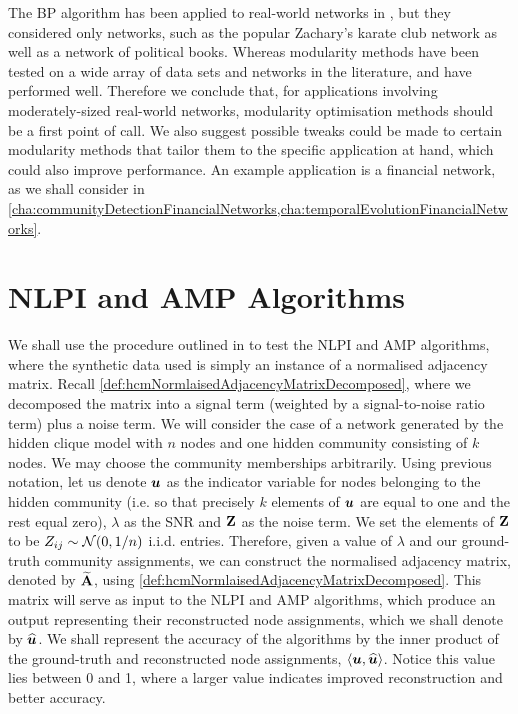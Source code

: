 The BP algorithm has been applied to real-world networks in \cite{DKM+13}, but they considered only networks, such as the popular Zachary's karate club network as well as a network of political books.
Whereas modularity methods have been tested on a wide array of data sets and networks in the literature, and have performed well.
Therefore we conclude that, for applications involving moderately-sized real-world networks, modularity optimisation methods should be a first point of call.
We also suggest possible tweaks could be made to certain modularity methods that tailor them to the specific application at hand, which could also improve performance.
An example application is a financial network, as we shall consider in \cref{cha:communityDetectionFinancialNetworks,cha:temporalEvolutionFinancialNetworks}.


\section{NLPI and AMP Algorithms}
\label{sec:NLPIAndAMPAlgorithms}

We shall use the procedure outlined in \cite{Mon13} to test the NLPI and AMP algorithms, where the synthetic data used is simply an instance of a normalised adjacency matrix. Recall \cref{def:hcmNormlaisedAdjacencyMatrixDecomposed}, where we decomposed the matrix into a signal term (weighted by a signal-to-noise ratio term) plus a noise term.
We will consider the case of a network generated by the hidden clique model with $n$ nodes and one hidden community consisting of $k$ nodes.
We may choose the community memberships arbitrarily. Using previous notation, let us denote $\vecvar{u}$ as the indicator variable for nodes belonging to the hidden community (i.e. so that precisely $k$ elements of $\vecvar{u}$ are equal to one and the rest equal zero), $\lambda$ as the SNR and $\mathbf Z$ as the noise term.
We set the elements of $\mathbf Z$ to be $Z_{ij} \sim \normal{0,1/n}$ i.i.d. entries.
Therefore, given a value of $\lambda$ and our ground-truth community assignments, we can construct the normalised adjacency matrix, denoted by $\widetilde{\mathbf A}$, using \cref{def:hcmNormlaisedAdjacencyMatrixDecomposed}.
This matrix will serve as input to the NLPI and AMP algorithms, which produce an output representing their reconstructed node assignments, which we shall denote by $\widehat{\vecvar{u}}$.
We shall represent the accuracy of the algorithms by the inner product of the ground-truth and reconstructed node assignments, $\innerP{\vecvar{u},\widehat{\vecvar{u}}}$.
Notice this value lies between 0 and 1, where a larger value indicates improved reconstruction and better accuracy.

